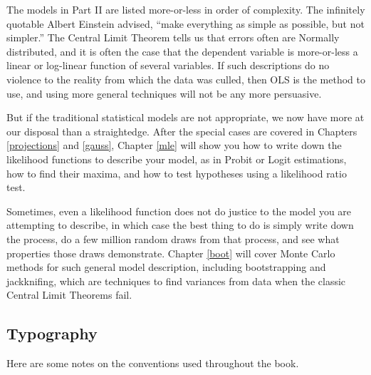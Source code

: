 The models in Part II are listed more-or-less in order of complexity.
The infinitely quotable Albert Einstein advised, ``make everything as
simple as possible, but not simpler.''  
The Central Limit Theorem tells us that errors often are
Normally distributed, and it is often the case that the dependent
variable is more-or-less a linear or log-linear function of several
variables. If such descriptions do no violence to the reality from
which the data was culled, then OLS is the method to use, and using more
general techniques will not be any more persuasive. 

But if the traditional statistical models are not appropriate, we now have
more at our disposal than a straightedge.
After the special cases are covered in Chapters \ref{projections}
and \ref{gauss}, Chapter \ref{mle} will show you how to write down the
likelihood functions to describe your model, as in Probit or Logit
estimations, how to find their maxima, and how to test hypotheses using
a likelihood ratio test.

Sometimes, even a likelihood function does not do justice to the model
you are attempting to describe, in which case the best thing to do is
simply write down the process, do a few million random draws from
that process, and see what properties those draws demonstrate.
Chapter \ref{boot} will cover Monte Carlo methods for such general
model description, including bootstrapping and jackknifing, which are
techniques to find variances from data when the classic Central Limit
Theorems fail.  

  

\subsection{Typography}
Here are some notes on the conventions used throughout the book.


